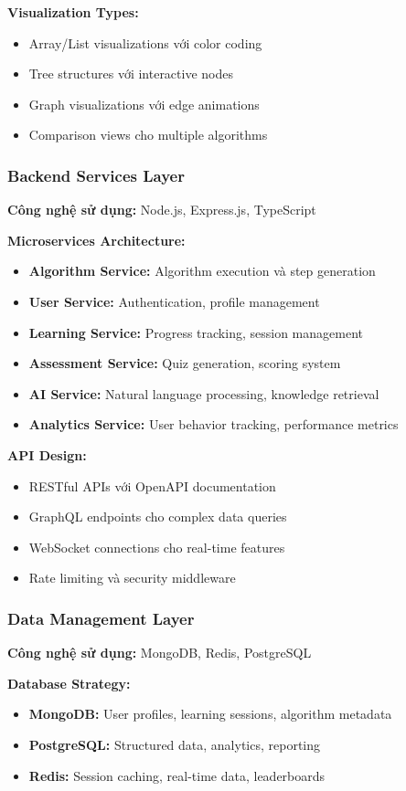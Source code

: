\textbf{Visualization Types:}
\begin{itemize}
    \item Array/List visualizations với color coding
    \item Tree structures với interactive nodes
    \item Graph visualizations với edge animations
    \item Comparison views cho multiple algorithms
\end{itemize}

\subsubsection{Backend Services Layer}
\textbf{Công nghệ sử dụng:} Node.js, Express.js, TypeScript

\textbf{Microservices Architecture:}
\begin{itemize}
    \item \textbf{Algorithm Service:} Algorithm execution và step generation
    \item \textbf{User Service:} Authentication, profile management
    \item \textbf{Learning Service:} Progress tracking, session management
    \item \textbf{Assessment Service:} Quiz generation, scoring system
    \item \textbf{AI Service:} Natural language processing, knowledge retrieval
    \item \textbf{Analytics Service:} User behavior tracking, performance metrics
\end{itemize}

\textbf{API Design:}
\begin{itemize}
    \item RESTful APIs với OpenAPI documentation
    \item GraphQL endpoints cho complex data queries
    \item WebSocket connections cho real-time features
    \item Rate limiting và security middleware
\end{itemize}

\subsubsection{Data Management Layer}
\textbf{Công nghệ sử dụng:} MongoDB, Redis, PostgreSQL

\textbf{Database Strategy:}
\begin{itemize}
    \item \textbf{MongoDB:} User profiles, learning sessions, algorithm metadata
    \item \textbf{PostgreSQL:} Structured data, analytics, reporting
    \item \textbf{Redis:} Session caching, real-time data, leaderboards
\end{itemize}

